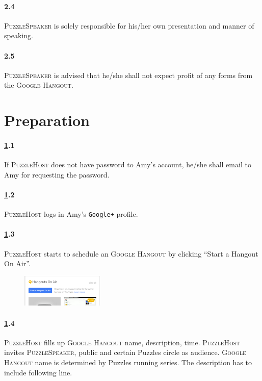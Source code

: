 \documentclass{article}
\newcommand{\hangout}{\textsc{Google Hangout}\xspace}
\newcommand{\host}{\textsc{PuzzleHost}\xspace}
\newcommand{\speaker}{\textsc{PuzzleSpeaker}\xspace}
\begin{document}
\paragraph{2.4} \speaker is solely responsible for his/her own presentation and manner of speaking.

\paragraph{2.5} \speaker is advised that he/she shall not expect profit of any forms from the \hangout.

\clearpage
\section{Preparation} \label{sec:prepare}

\paragraph{\ref{sec:prepare}.1} If \host does not have password to Amy's account, he/she shall email to Amy for requesting the password.

\paragraph{\ref{sec:prepare}.2} \host logs in Amy's \texttt{Google+} profile.

\paragraph{\ref{sec:prepare}.3} \host starts to schedule an \hangout by clicking ``Start a Hangout On Air''.

\begin{figure}[!htm]
\centering
\includegraphics[width=0.35\textwidth]{images/sop_start_hangout.eps}
\end{figure}

\paragraph{\ref{sec:prepare}.4} \host fills up \hangout name, description, time. \host invites \speaker, public and certain Puzzles circle as audience. \hangout name is determined by Puzzles running series. The description has to include following line.
\end{document}
